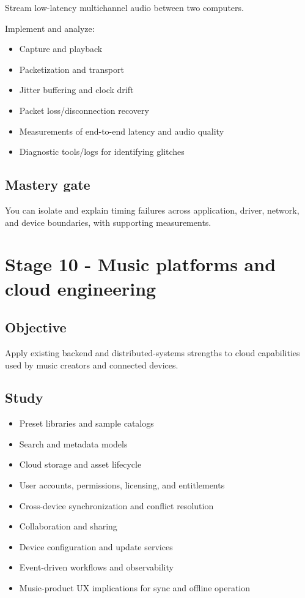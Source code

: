 \documentclass[11pt,letterpaper]{article}
\begin{document}
Stream low-latency multichannel audio between two computers.

Implement and analyze:

\begin{itemize}
\item Capture and playback
\item Packetization and transport
\item Jitter buffering and clock drift
\item Packet loss/disconnection recovery
\item Measurements of end-to-end latency and audio quality
\item Diagnostic tools/logs for identifying glitches
\end{itemize}

\subsection*{Mastery gate}\label{mastery-gate-9}

You can isolate and explain timing failures across application, driver, network, and device boundaries, with supporting measurements.

\clearpage

\section{Stage 10 - Music platforms and cloud engineering}\label{stage-10-music-platforms-and-cloud-engineering}

\subsection*{Objective}\label{objective-10}

Apply existing backend and distributed-systems strengths to cloud capabilities used by music creators and connected devices.

\subsection*{Study}\label{study-7}

\begin{itemize}
\item Preset libraries and sample catalogs
\item Search and metadata models
\item Cloud storage and asset lifecycle
\item User accounts, permissions, licensing, and entitlements
\item Cross-device synchronization and conflict resolution
\item Collaboration and sharing
\item Device configuration and update services
\item Event-driven workflows and observability
\item Music-product UX implications for sync and offline operation
\end{itemize}
\end{document}
